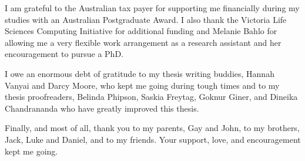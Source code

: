 \documentclass[11pt,a4paper,oneside]{book}	%
\begin{document}
I am grateful to the Australian tax payer for supporting me financially during my studies with an Australian Postgraduate Award. I also thank the Victoria Life Sciences Computing Initiative for additional funding and Melanie Bahlo for allowing me a very flexible work arrangement as a research assistant and her encouragement to pursue a PhD.

I owe an enormous debt of gratitude to my thesis writing buddies, Hannah Vanyai and Darcy Moore, who kept me going during tough times and to my thesis proofreaders, Belinda Phipson, Saskia Freytag, Goknur Giner, and Dineika Chandrananda who have greatly improved this thesis.

Finally, and most of all, thank you to my parents, Gay and John, to my brothers, Jack, Luke and Daniel, and to my friends. Your support, love, and encouragement kept me going.

\tableofcontents

\listoffigures

\listoftables

\mainmatter











\appendix

\backmatter


\end{document}
